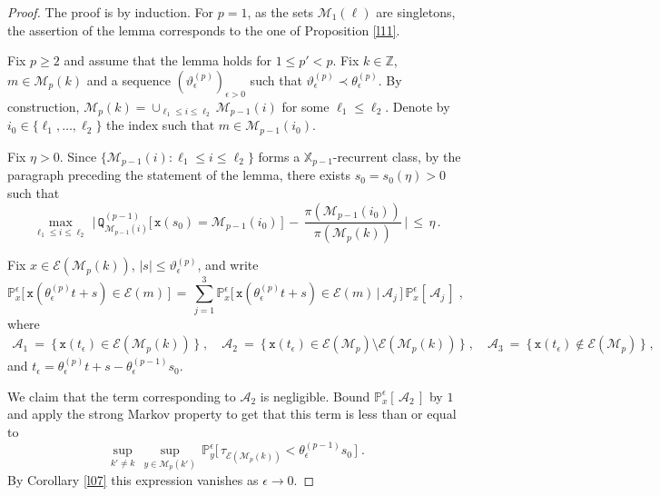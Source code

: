 \documentclass[reqno]{amsart}
\theoremstyle{plain}
\theoremstyle{definition}
\newcommand{\bb}[1]{{\mathbb #1}}
\newcommand{\ms}[1]{{\mathscr #1}}
\newcommand{\mtt}[1]{{\mathtt #1}}
\newcounter{as}[section]
\newcommand{\<}{\langle}
\renewcommand{\>}{\rangle}
\begin{document}
\begin{proof}
The proof is by induction. For $p=1$, as the sets 
$\ms M_1(\ell)$ are singletons, the assertion of the lemma
corresponds to the one of Proposition \ref{l11}.

Fix $p\ge2$ and assume that the lemma holds for $1\le p'<p$.  Fix 
$k\in \bb Z$, $m \in \ms M_p(k)$ and a sequence
$(\vartheta^{(p)}_\epsilon)_{\epsilon>0}$ such that
$\vartheta^{(p)}_\epsilon\prec\theta_{\epsilon}^{(p)}$.  By
construction,
$\ms M_p(k) = \cup_{\ell_1 \le i\le \ell_2} \ms M_{p-1}(i)$ for some
$\ell_1\le\ell_2$. Denote by $i_0 \in \{\ell_1, \dots, \ell_2\}$ the
index such that $m \in \ms M_{p-1}(i_0)$.

Fix $\eta>0$. Since
$\{ \ms M_{p-1}(i) : \ell_1 \le i\le \ell_2\}$ forms a
$\bb X_{p-1}$-recurrent class, by the paragraph preceding the
statement of the lemma, there exists $s_{0}=s_{0}(\eta)>0$ such that
\begin{equation}
\label{93}
\max_{\ell_1 \le i \le \ell_2}\,\Big |\,
\mtt Q_{\ms M_{p-1}(i)}^{(p-1)} \big[\, \mtt x (s_{0}) =
\ms M_{p-1}(i_0)\,\big]
\,-\, \frac{\pi(\ms M_{p-1}(i_0))}{\pi(\ms M_p(k))}\,\Big | \,\le\,
\eta\,.
\end{equation}

Fix $x\in \ms E(\ms M_p(k))$, $|s|\le\vartheta^{(p)}_\epsilon$,
and write
\begin{equation*}
\bb P_x^{\epsilon }\big[\, \mtt x(\theta_{\epsilon}^{(p)}t+s) \in
\ms E(m) \,\big]
\,=\,  \sum_{j=1}^{3} \bb P_x^{\epsilon } \big[\, \mtt x
(\theta_{\epsilon}^{(p)}t+s) \in \ms E(m)
\,\big|\,\mathscr{A}_{j}\,\big]\,
\bb P_x^{\epsilon } [\,\mathscr{A}_{j}\,]\;,
\end{equation*}
where
\begin{gather*}
\mathscr{A}_{1}\ =\ \{\, \mtt x (t_{\epsilon}) \in \ms E(\ms M_{p}(k))
\,\} \;,\quad \mathscr{A}_{2}\ =\ \{\, \mtt x (t_{\epsilon}) \in \ms
E(\ms M_{p}) \setminus \ms E(\ms M_{p}(k)) \,\}\;, \quad
\mathscr{A}_{3}\ =\ \{\, \mtt x (t_{\epsilon})\not\in \ms E(\ms M_{p})
\,\}\;,
\end{gather*}
and $t_{\epsilon}=\theta_{\epsilon}^{(p)}t+s-\theta_{\epsilon}^{(p-1)}s_{0}$.

We claim that the term corresponding to $\mathscr{A}_{2}$ is
negligible.  Bound $\bb P_x^{\epsilon } [\,\mathscr{A}_{2}\,]$ by
$1$ and apply the strong Markov property to get that this term is less
than or equal to
\begin{equation*}
\sup_{k'\neq k}\,\sup_{y\in \ms M_p(k')}\,
\mathbb{P}_{y}^{\epsilon}\big[\,\tau_{\ms E(\ms M_p(k))}
<\theta_{\epsilon}^{(p-1)}s_{0}\,\big]\;.
\end{equation*}
By Corollary \ref{l07} this expression vanishes as $\epsilon\to 0$.


\end{proof}
\end{document}

